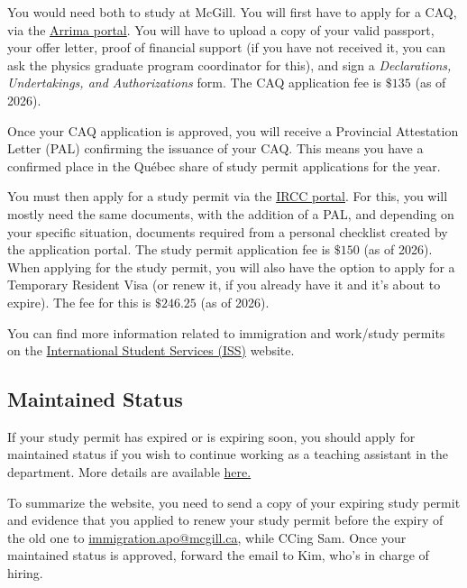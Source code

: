 You would need both to study at McGill. You will first have to apply for a CAQ, via the \href{https://arrima.immigration-quebec.gouv.qc.ca/aiguillage}{Arrima portal}. You will have to upload a copy of your valid passport, your offer letter, proof of financial support (if you have not received it, you can ask the physics graduate program coordinator for this), and sign a \textit{Declarations, Undertakings, and Authorizations} form. The CAQ application fee is $\$135$ (as of 2026).

Once your CAQ application is approved, you will receive a Provincial Attestation Letter (PAL) confirming the issuance of your CAQ. This means you have a confirmed place in the Qu\'ebec share of study permit applications for the year.

You must then apply for a study permit via the \href{https://www.canada.ca/en/immigration-refugees-citizenship.html}{IRCC portal}. For this, you will mostly need the same documents, with the addition of a PAL, and depending on your specific situation, documents required from a personal checklist created by the application portal. The study permit application fee is $\$150$ (as of 2026). When applying for the study permit, you will also have the option to apply for a Temporary Resident Visa (or renew it, if you already have it and it's about to expire). The fee for this is $\$246.25$ (as of 2026).

You can find more information related to immigration and work/study permits on the \href{https://www.mcgill.ca/internationalstudents/work}{International Student Services (ISS)} website.

\subsection*{Maintained Status}
If your study permit has expired or is expiring soon, you should apply for maintained status if you wish to continue working as a teaching assistant in the department. More details are available \href{https://www.mcgill.ca/apo/staff-guides/immigration/maintained-status}{here.}

To summarize the website, you need to send a copy of your expiring study permit and evidence that you applied to renew your study permit before the expiry of the old one to \href{mailto:immigration.apo@mcgill.ca}{immigration.apo@mcgill.ca}, while CCing Sam. Once your maintained status is approved, forward the email to Kim, who's in charge of hiring.

